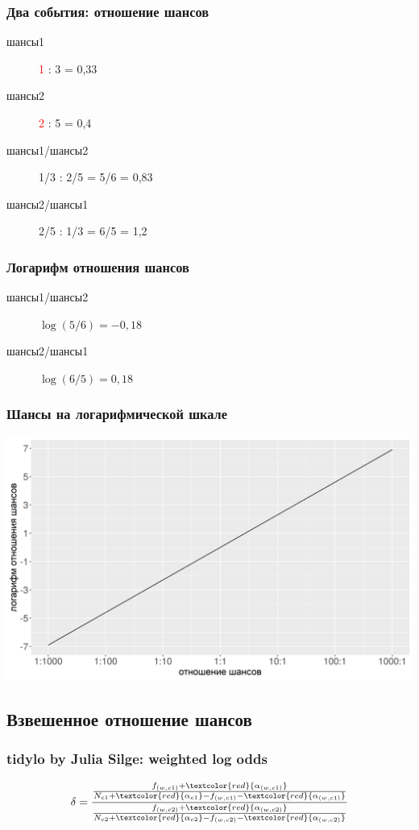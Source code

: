 \documentclass[svgnames]{beamer}
\begin{document}
\begin{frame}
  \frametitle{Два события: отношение шансов}
  \Large
  \begin{description}
  \item[шансы1] \textcolor{red}{1} : 3 = 0,33
  \item[шансы2] \textcolor{red}{2} : 5 = 0,4
  \item[шансы1/шансы2] 1/3 : 2/5 = 5/6 = 0,83
  \item[шансы2/шансы1] 2/5 : 1/3 = 6/5 = 1,2
  \end{description}
\end{frame}

\begin{frame}
  \frametitle{Логарифм отношения шансов}
  \Large
  \begin{description}
  \item[шансы1/шансы2] $\log (5/6) = -0,18$
  \item[шансы2/шансы1] $\log (6/5) = 0,18$
  \end{description}
\end{frame}

\begin{frame}
  \frametitle{Шансы на логарифмической шкале}
  \includegraphics[width=\textwidth]{logodds}
\end{frame}

\subsection{Взвешенное отношение шансов}


\begin{frame}
  \frametitle{tidylo by Julia Silge: weighted log odds}
  \LARGE
    $$
    \delta =
    \frac{\frac{f_{(w,c1)}+\textcolor{red}{\alpha_{(w,c1)}}}{N_{c1}+\textcolor{red}{\alpha_{c1}}-f_{(w,c1)}-\textcolor{red}{\alpha_{(w,c1)}}}}{\frac{f_{(w,c2)}+\textcolor{red}{\alpha_{(w,c2)}}}{N_{c2}+\textcolor{red}{\alpha_{c2}}-f_{(w,c2)}-\textcolor{red}{\alpha_{(w,c2)}}}}
    $$
\end{frame}
\end{document}
